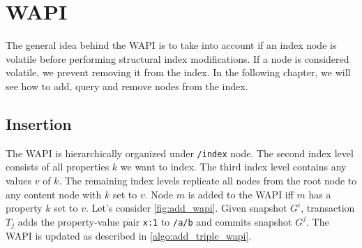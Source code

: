\documentclass[abstracton,12pt]{scrreprt}
\begin{document}
\chapter{WAPI}

The general idea behind the WAPI is to take into account if an index node is volatile before performing structural index modifications.
If a node is considered volatile, we prevent removing it from the index.
In the following chapter, we will see how to add, query and remove nodes from the index.

\section{Insertion}

The WAPI is hierarchically organized under \texttt{/index} node.
The second index level consists of all properties $k$ we want to index.
The third index level contains any values $v$ of $k$.
The remaining index levels replicate all nodes from the root node to any content node with $k$ set to $v$.
Node $m$ is added to the WAPI iff $m$ has a property $k$ set to $v$.
Let's consider \cref{fig:add_wapi}.
Given snapshot $G^i$, transaction $T_j$ adds the property-value pair \texttt{x:1} to \texttt{/a/b} and commits snapshot $G^j$.
The WAPI is updated as described in \cref{algo:add_triple_wapi}.
\end{document}
